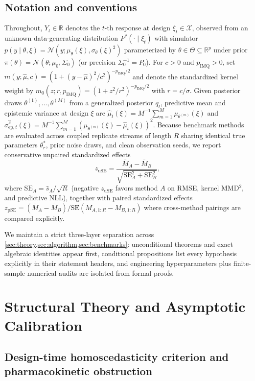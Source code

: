 \documentclass[11pt,a4paper,reqno]{amsart}
\theoremstyle{definition}
\theoremstyle{remark}
\newcommand{\R}{\mathbb{R}}
\newcommand{\Ncal}{\mathcal{N}}
\newcommand{\Xcal}{\mathcal{X}}
\begin{document}
\subsection{Notation and conventions}\label{sec:notation}
Throughout, $Y_t \in \R$ denotes the $t$-th response at design $\xi_t \in \Xcal$, observed from an unknown data-generating distribution $P^*(\cdot \mid \xi_t)$ with simulator $p(y \mid \theta, \xi) = \Ncal(y; \mu_\theta(\xi), \sigma_\theta(\xi)^2)$ parameterized by $\theta \in \Theta \subseteq \R^p$ under prior $\pi(\theta) = \Ncal(\theta; \mu_0, \Sigma_0)$ (or precision $\Sigma_0^{-1} = P_0$). For $c > 0$ and $p_{\mathrm{IMQ}} > 0$, set $m(y; \hat{\mu}, c) = (1 + (y - \hat{\mu})^2 / c^2)^{-p_{\mathrm{IMQ}}/2}$ and denote the standardized kernel weight by $m_0(z; r, p_{\mathrm{IMQ}}) = (1 + z^2 / r^2)^{-p_{\mathrm{IMQ}}/2}$ with $r = c/\sigma$. Given posterior draws $\theta^{(1)}, \dots, \theta^{(M)}$ from a generalized posterior $q_t$, predictive mean and epistemic variance at design $\xi$ are $\hat{\mu}_t(\xi) = M^{-1}\sum_{m=1}^M \mu_{\theta^{(m)}}(\xi)$ and $\hat{\sigma}_{\mathrm{ep}, t}^2(\xi) = M^{-1}\sum_{m=1}^M (\mu_{\theta^{(m)}}(\xi) - \hat{\mu}_t(\xi))^2$. Because benchmark methods are evaluated across coupled replicate streams of length $R$ sharing identical true parameters $\theta^*_r$, prior noise draws, and clean observation seeds, we report conservative unpaired standardized effects
\[
z_{\mathrm{uSE}} = \frac{\bar{M}_A - \bar{M}_B}{\sqrt{\mathrm{SE}_A^2 + \mathrm{SE}_B^2}},
\]
where $\mathrm{SE}_A = \hat{s}_A / \sqrt{R}$ (negative $z_{\mathrm{uSE}}$ favors method $A$ on RMSE, kernel MMD$^2$, and predictive NLL), together with paired standardized effects $z_{\mathrm{pSE}} = (\bar{M}_A - \bar{M}_B)/\mathrm{SE}(M_{A,1:R} - M_{B,1:R})$ where cross-method pairings are compared explicitly.

We maintain a strict three-layer separation across \cref{sec:theory,sec:algorithm,sec:benchmarks}: unconditional theorems and exact algebraic identities appear first, conditional propositions list every hypothesis explicitly in their statement headers, and engineering hyperparameters plus finite-sample numerical audits are isolated from formal proofs.

\section{Structural Theory and Asymptotic Calibration}\label{sec:theory}

\subsection{Design-time homoscedasticity criterion and pharmacokinetic obstruction}
\end{document}
